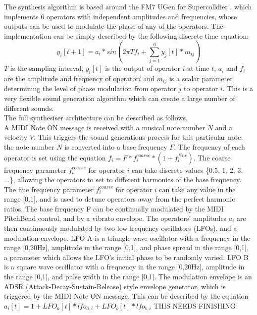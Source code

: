 \documentclass[11pt, oneside]{report}   	%
\begin{document}
The synthesis algorithm is based around the FM7 UGen for Supercolldier \cite{UGen}, which implements 6 operators with independent amplitudes and frequencies, whose outputs can be used to modulate the phase of any of the operators. The implementation can be simply described by the following discrete time equation:
\begin{equation}
y_i[t+1] = a_i*sin(2\pi T f_i + \sum_{j = 1}^{6} y_j[t]*m_{ij})
\end{equation}
$T$ is the sampling interval,  $y_i[t]$ is the output of operator $i$ at time $t$, $a_i$ and $f_i$ are the amplitude and frequency of operator$i$ and $m_{ij}$ is a scalar parameter determining the level of phase modulation from operator $j$ to operator $i$. This is a very flexible sound generation algorithm which can create a large number of different sounds. \\
The full synthesiser architecture can be described as follows.\\
 A MIDI Note ON message is received with a musical note number $N$ and a velocity $V$. This triggers the sound generations process for this particular note. the note number $N$ is converted into a base frequency $F$. The frequency of each operator is set using the equation $f_i = F*f_i^{coarse}*(1+f_i^{fine})$. 
The coarse frequency parameter $f_i^{coarse}$ for operator $i$ can take discrete values \{0.5, 1, 2, 3, ...\}, allowing the operators to set to different harmonics of the base frequency. The fine frequency parameter $f_i^{coarse}$ for operator $i$ can take any value in the range [0,1], and is used to detune operators away from the perfect harmonic ratios.
The base frequency F can be continually modulated by the MIDI PitchBend control, and by a vibrato envelope. 
The operators' amplitudes $a_i$ are then continuously modulated by two low frequency oscillators (LFOs), and a modulation envelope. LFO A is a triangle wave oscillator with a frequency in the range [0,20\si{\hertz}], amplitude in the range [0,1], and phase spread in the range [0,1], a parameter which allows the LFO's initial phase to be randomly varied. LFO B is a square wave oscillator with a frequency in the range [0,20\si{\hertz}], amplitude in the range [0,1], and pulse width in the range [0,1]. The modulation envelope is an ADSR (Attack-Decay-Sustain-Release) style envelope generator, which is triggered by the MIDI Note ON message.
This can be described by the equation $a_i[t] = 1 + LFO_a[t]*lfo_{a,i} + LFO_b[t]*lfo_{b,i}$ THIS NEEDS FINISHING
\end{document}
